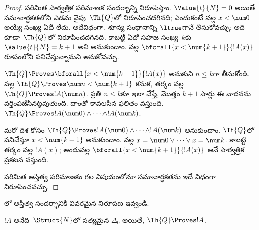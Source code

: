 \documentclass[../../../include/open-logic-section]{subfiles}
\begin{document}
\begin{proof}
    పరిమిత సార్వత్రిక పరిమాణక సందర్భాన్ని నిరూపిస్తాం.
    $\Value{t}{N}=0$ అయితే సమానార్థకతలోని ఎడమ వైపు~$\Th{Q}$లో
    నిరూపించదగినది; ఎందుకంటే  వల్ల
    $x<\num0$ అయ్యే సంఖ్య ఏదీ లేదు. అదేవిధంగా, శూన్య సంధానాన్ని
    $\ltrue$గానే తీసుకోవచ్చు; అది కూడా~$\Th{Q}$లో నిరూపించదగినది.
    కాబట్టి ఏదో సహజ సంఖ్య~$k$కు $\Value{t}{N}=k+1$ అని అనుకుందాం.
     వల్ల
    $\bforall{x<\num{k+1}}{!A(x)}$ రూపంలోని  పనిచేస్తున్నామని
    అనుకోవచ్చు.

    $\Th{Q}\Proves\bforall{x<\num{k+1}}{!A(x)}$ అనుకుని $n\leq k$గా
    తీసుకోండి.  వల్ల
    $\Th{Q}\Proves\num n<\num{k+1}$ కనుక, తర్కం వల్ల
    $\Th{Q}\Proves !A(\num n)$. ప్రతి $n\leq k$కూ ఇలా చేస్తే, మొత్తం $k+1$
సార్లు ఈ వాదనను వర్తింపజేసినట్టవుతుంది. దాంతో కావలసిన ఫలితం వస్తుంది.
    $\Th{Q}\Proves !A(\num0)\land\dots\land !A(\num k)$.

    మరో దిశ కోసం $\Th{Q}\Proves
    !A(\num0)\land\dots\land !A(\num k)$ అనుకుందాం. $\Th{Q}$లో పనిచేస్తూ
    $x<\num{k+1}$ అనుకుందాం.  వల్ల
    $x=\num0\lor\dots\lor x=\num k$. కాబట్టి తర్కం వల్ల $!A(x)$;
    అందువల్ల $\bforall{x<\num{k+1}}{!A(x)}$ అనే సార్వత్రిక ప్రకటన వస్తుంది.

    పరిమిత అస్తిత్వ పరిమాణకం గల  విషయంలోనూ
సమానార్థకతను ఇదే విధంగా నిరూపించవచ్చు.
\end{proof}

\begin{prob}
లో అస్తిత్వ సందర్భానికి వివరమైన నిరూపణ ఇవ్వండి.
\end{prob}

\begin{lem}
$!A$ అనేది~$\Struct{N}$లో సత్యమైన $\Delta_0$  అయితే,
$\Th{Q}\Proves !A$.
\end{lem}
\end{document}
